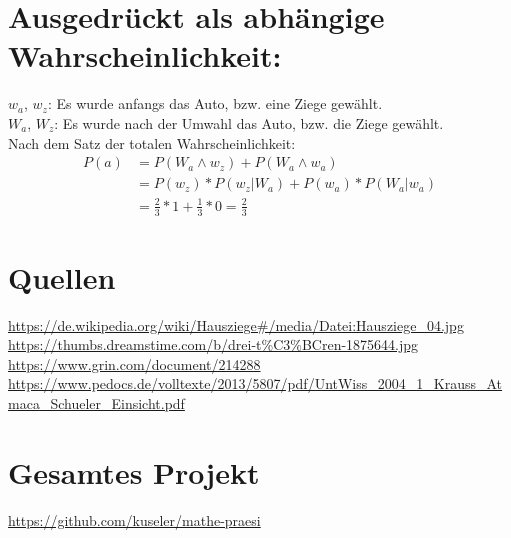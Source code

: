 \documentclass[a4paper]{article}
\begin{document}
\section{Ausgedrückt als abhängige Wahrscheinlichkeit:}
	$w_a$, $w_z$: Es wurde anfangs das Auto, bzw. eine Ziege gewählt.\\
	$W_a$, $W_z$: Es wurde nach der Umwahl das Auto, bzw. die Ziege gewählt.\\
	Nach dem Satz der totalen Wahrscheinlichkeit:
	\begin{align*}
	P(a) &= P(W_a \land w_z) + P(W_a \land w_a) \\&= P(w_z) * P(w_z|W_a) + P(w_a) * P(W_a|w_a)\\
	&= \frac{2}{3} * 1 + \frac{1}{3} * 0 = \frac{2}{3}
	\end{align*}
\section{Quellen}
		\url{https://de.wikipedia.org/wiki/Hausziege#/media/Datei:Hausziege_04.jpg}\\
		\url{https://thumbs.dreamstime.com/b/drei-t\%C3\%BCren-1875644.jpg}\\
		\url{https://www.grin.com/document/214288}\\
		\url{https://www.pedocs.de/volltexte/2013/5807/pdf/UntWiss_2004_1_Krauss_Atmaca_Schueler_Einsicht.pdf}
\section{Gesamtes Projekt}
\url{https://github.com/kuseler/mathe-praesi}
\end{document}
